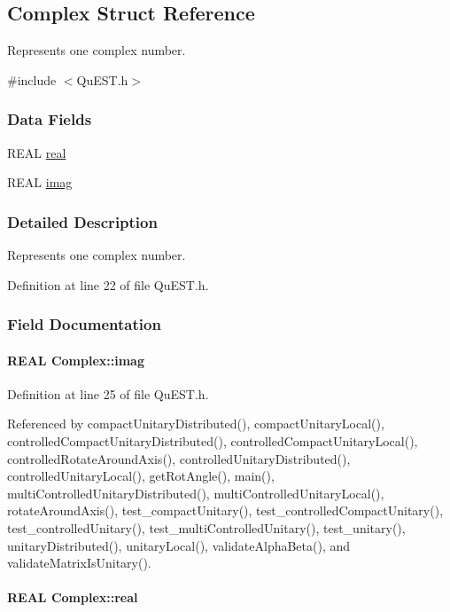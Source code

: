 \hypertarget{structComplex}{
\subsection{Complex Struct Reference}
\label{structComplex}
}


Represents one complex number.  


{\ttfamily \#include $<$QuEST.h$>$}\subsubsection*{Data Fields}
\begin{DoxyCompactItemize}
\item 
REAL \hyperlink{structComplex_a479ad939835457595fcca3ca55c06283}{real}
\item 
REAL \hyperlink{structComplex_a1151948284b21c0052f203f23ab931d9}{imag}
\end{DoxyCompactItemize}


\subsubsection{Detailed Description}
Represents one complex number. 

Definition at line 22 of file QuEST.h.

\subsubsection{Field Documentation}
\hypertarget{structComplex_a1151948284b21c0052f203f23ab931d9}{
\paragraph[{imag}]{\setlength{\rightskip}{0pt plus 5cm}REAL {\bf Complex::imag}}\hfill}
\label{structComplex_a1151948284b21c0052f203f23ab931d9}


Definition at line 25 of file QuEST.h.

Referenced by compactUnitaryDistributed(), compactUnitaryLocal(), controlledCompactUnitaryDistributed(), controlledCompactUnitaryLocal(), controlledRotateAroundAxis(), controlledUnitaryDistributed(), controlledUnitaryLocal(), getRotAngle(), main(), multiControlledUnitaryDistributed(), multiControlledUnitaryLocal(), rotateAroundAxis(), test\_\-compactUnitary(), test\_\-controlledCompactUnitary(), test\_\-controlledUnitary(), test\_\-multiControlledUnitary(), test\_\-unitary(), unitaryDistributed(), unitaryLocal(), validateAlphaBeta(), and validateMatrixIsUnitary().\hypertarget{structComplex_a479ad939835457595fcca3ca55c06283}{
\paragraph[{real}]{\setlength{\rightskip}{0pt plus 5cm}REAL {\bf Complex::real}}\hfill}
\label{structComplex_a479ad939835457595fcca3ca55c06283}


